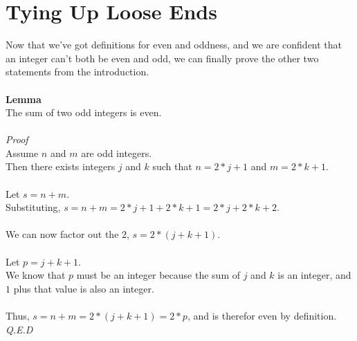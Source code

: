 \documentclass[a4paper,12pt]{article}
\begin{document}
\section{Tying Up Loose Ends}
Now that we've got definitions for even and oddness, and we are confident that an integer can't both be even and odd, we can finally prove the other two statements from the introduction.\\
\\
\textbf{Lemma}\\  
The sum of two odd integers is even.\\
\\
\textit{Proof}\\
Assume $n$ and $m$ are odd integers.\\
Then there exists integers $j$ and $k$ such that $n = 2*j + 1$ and $m = 2*k + 1$.\\
\\
Let $s = n + m$.\\
Substituting, $s = n + m = 2*j + 1 + 2*k + 1 = 2*j + 2*k + 2$.\\
\\
We can now factor out the $2$, $s = 2*(j + k + 1)$.\\
\\
Let $p = j + k + 1$.\\
We know that $p$ must be an integer because the sum of $j$ and $k$ is an integer, and $1$ plus that value is also an integer.\\
\\
Thus, $s = n + m = 2*(j + k + 1) = 2*p$, and is therefor even by definition.\\
\textit{Q.E.D}
\end{document}
